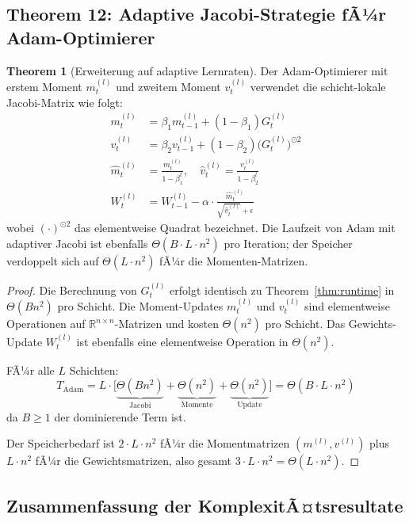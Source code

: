 ﻿\documentclass[a4paper,12pt]{article}
\theoremstyle{definition}
\newtheorem{theorem}{Theorem}
\begin{document}
\subsection{Theorem 12: Adaptive Jacobi-Strategie fÃ¼r Adam-Optimierer}

\begin{theorem}[Erweiterung auf adaptive Lernraten]
	\label{thm:adam_jacobi}
	Der Adam-Optimierer \cite{Kingma2014} mit erstem Moment $m^{(l)}_t$ und zweitem Moment $v^{(l)}_t$ verwendet die schicht-lokale Jacobi-Matrix wie folgt:
	\begin{align*}
		m^{(l)}_t &= \beta_1 m^{(l)}_{t-1} + (1-\beta_1) G^{(l)}_t \\
		v^{(l)}_t &= \beta_2 v^{(l)}_{t-1} + (1-\beta_2) \bigl(G^{(l)}_t\bigr)^{\odot 2}\\
		\hat{m}^{(l)}_t &= \frac{m^{(l)}_t}{1-\beta_1^t}, \quad \hat{v}^{(l)}_t = \frac{v^{(l)}_t}{1-\beta_2^t}\\
		W^{(l)}_t &= W^{(l)}_{t-1} - \alpha \cdot \frac{\hat{m}^{(l)}_t}{\sqrt{\hat{v}^{(l)}_t} + \epsilon}
	\end{align*}
	wobei $(\cdot)^{\odot 2}$ das elementweise Quadrat bezeichnet. Die Laufzeit von Adam mit adaptiver Jacobi ist ebenfalls $\Theta(B \cdot L \cdot n^2)$ pro Iteration; der Speicher verdoppelt sich auf $\Theta(L \cdot n^2)$ fÃ¼r die Momenten-Matrizen.
\end{theorem}

\begin{proof}
	Die Berechnung von $G^{(l)}_t$ erfolgt identisch zu Theorem~\ref{thm:runtime} in $\Theta(B n^2)$ pro Schicht. Die Moment-Updates $m^{(l)}_t$ und $v^{(l)}_t$ sind elementweise Operationen auf $\mathbb{R}^{n \times n}$-Matrizen und kosten $\Theta(n^2)$ pro Schicht. Das Gewichts-Update $W^{(l)}_t$ ist ebenfalls eine elementweise Operation in $\Theta(n^2)$.
	
	FÃ¼r alle $L$ Schichten:
	\[
	T_{\mathrm{Adam}} = L \cdot \bigl[\underbrace{\Theta(Bn^2)}_{\text{Jacobi}} + \underbrace{\Theta(n^2)}_{\text{Momente}} + \underbrace{\Theta(n^2)}_{\text{Update}}\bigr] = \Theta(B \cdot L \cdot n^2)
	\]
	da $B \geq 1$ der dominierende Term ist.
	
	Der Speicherbedarf ist $2 \cdot L \cdot n^2$ fÃ¼r die Momentmatrizen $(m^{(l)}, v^{(l)})$ plus $L \cdot n^2$ fÃ¼r die Gewichtsmatrizen, also gesamt $3 \cdot L \cdot n^2 = \Theta(L \cdot n^2)$.
\end{proof}

\subsection{Zusammenfassung der KomplexitÃ¤tsresultate}
\end{document}
